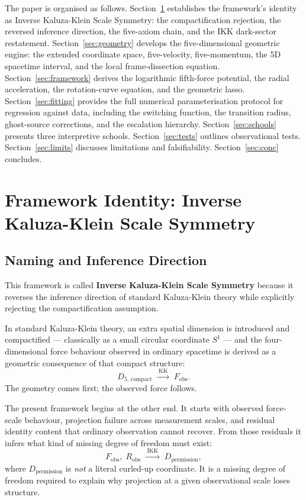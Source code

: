 \documentclass[11pt,a4paper]{article}
\begin{document}
\medskip
\noindent
The paper is organised as follows.
Section~\ref{sec:ikk} establishes the framework's identity as Inverse
Kaluza-Klein Scale Symmetry: the compactification rejection, the reversed
inference direction, the five-axiom chain, and the IKK dark-sector
restatement.
Section~\ref{sec:geometry} develops the five-dimensional geometric engine:
the extended coordinate space, five-velocity, five-momentum, the 5D spacetime
interval, and the local frame-dissection equation.
Section~\ref{sec:framework} derives the logarithmic fifth-force potential,
the radial acceleration, the rotation-curve equation, and the geometric lasso.
Section~\ref{sec:fitting} provides the full numerical parameterisation protocol
for regression against data, including the switching function, the transition
radius, ghost-source corrections, and the escalation hierarchy.
Section~\ref{sec:schools} presents three interpretive schools.
Section~\ref{sec:tests} outlines observational tests.
Section~\ref{sec:limits} discusses limitations and falsifiability.
Section~\ref{sec:conc} concludes.

\section{Framework Identity: Inverse Kaluza-Klein Scale Symmetry}
\label{sec:ikk}

\subsection{Naming and Inference Direction}

This framework is called \textbf{Inverse Kaluza-Klein Scale Symmetry} because
it reverses the inference direction of standard Kaluza-Klein theory while
explicitly rejecting the compactification assumption.

In standard Kaluza-Klein theory, an extra spatial dimension is introduced and
compactified --- classically as a small circular coordinate $S^1$ --- and the
four-dimensional force behaviour observed in ordinary spacetime is derived as a
geometric consequence of that compact structure:
\[
  D_{5,\,\text{compact}} \;\xrightarrow{\;\text{KK}\;}\; F_{\text{obs}} .
\]
The geometry comes first; the observed force follows.

The present framework begins at the other end.  It starts with observed
force-scale behaviour, projection failure across measurement scales, and
residual identity content that ordinary observation cannot recover.  From
those residuals it infers what kind of missing degree of freedom must exist:
\[
  F_{\text{obs}},\; R_{\text{obs}}
  \;\xrightarrow{\;\text{IKK}\;}\;
  D_{\text{permission}} ,
\]
where $D_{\text{permission}}$ is \emph{not} a literal curled-up coordinate.
It is a missing degree of freedom required to explain why projection at a
given observational scale loses structure.
\end{document}
